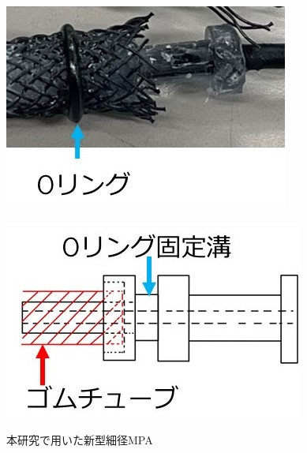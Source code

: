 \begin{figure}[!hb]
  \begin{minipage}{0.49\hsize}
    \centering
    \includegraphics[scale=0.5]{image/MPA_tanbu_2_2.jpg}
    \label{fig:MPA_tanbu_2_1}
  \end{minipage}
  \begin{minipage}{0.49\hsize}
    \centering  
    \includegraphics[scale=0.5]{image/MPA_tanbu_2_1.jpg}
    \label{fig:MPA_tanbu_2_2}
  \end{minipage}
  \caption{本研究で用いた新型細径MPA}
  \label{fig:MPA_tanbu_2}
\end{figure}
